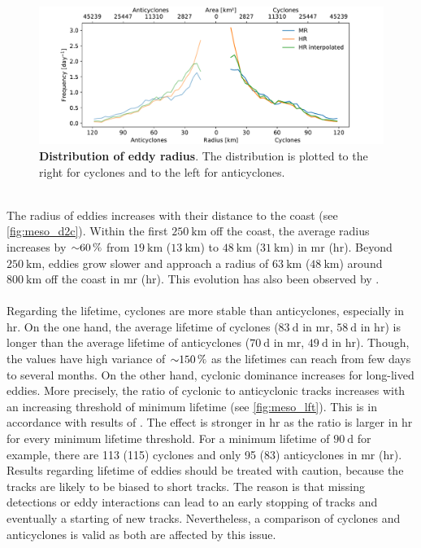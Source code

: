 \begin{figure}
    \centering
    \includegraphics[width=15cm]{../figures/result_eddies_area.pdf}
    \caption[Distribution of eddy radius]{\textbf{Distribution of eddy radius}. The distribution is plotted to the right for cyclones and to the left for anticyclones.}\label{fig:eddy-area}
\end{figure}
\\
The radius of eddies increases with their distance to the coast (see \autoref{fig:meso_d2c}). Within the first $\SI{250}{\kilo\metre}$ off the coast, the average radius increases by ${\sim} \SI{60}{\percent}$ from $\SI{19}{\kilo\metre}$ ($\SI{13}{\kilo\metre}$) to $\SI{48}{\kilo\metre}$ ($\SI{31}{\kilo\metre}$) in \ac{mr} (\ac{hr}). Beyond $\SI{250}{\kilo\metre}$, eddies grow slower and approach a radius of $\SI{63}{\kilo\metre}$ ($\SI{48}{\kilo\metre}$) around $\SI{800}{\kilo\metre}$ off the coast in \ac{mr} (\ac{hr}). This evolution has also been observed by \textcite[see their Figure 8]{kurian-2011-eddy-props}.\\
\\
Regarding the lifetime, cyclones are more stable than anticyclones, especially in \ac{hr}. On the one hand, the average lifetime of cyclones ($\SI{83}{\day}$ in \ac{mr}, $\SI{58}{\day}$ in \ac{hr}) is longer than the average lifetime of anticyclones ($\SI{70}{\day}$ in \ac{mr}, $\SI{49}{\day}$ in \ac{hr}). Though, the values have high variance of ${\sim} \SI{150}{\percent}$ as the lifetimes can reach from few days to several months. On the other hand, cyclonic dominance increases for long-lived eddies. More precisely, the ratio of cyclonic to anticyclonic tracks increases with an increasing threshold of minimum lifetime (see \autoref{fig:meso_lft}). This is in accordance with results of \textcite[see their Figure 5]{kurian-2011-eddy-props}. The effect is stronger in \ac{hr} as the ratio is larger in \ac{hr} for every minimum lifetime threshold. For a minimum lifetime of $\SI{90}{\day}$ for example, there are 113 (115) cyclones and only 95 (83) anticyclones in \ac{mr} (\ac{hr}). Results regarding lifetime of eddies should be treated with caution, because the tracks are likely to be biased to short tracks. The reason is that missing detections or eddy interactions can lead to an early stopping of tracks and eventually a starting of new tracks. Nevertheless, a comparison of cyclones and anticyclones is valid as both are affected by this issue.
